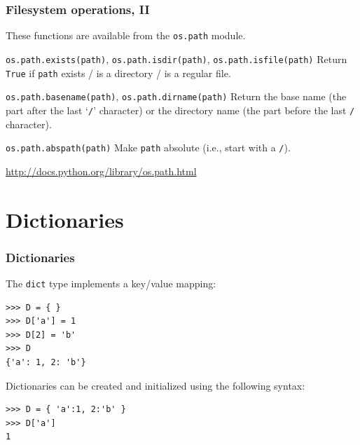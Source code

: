 \documentclass[english,serif,mathserif,xcolor=pdftex,dvipsnames,table]{beamer}
\begin{document}
\begin{frame}[fragile]
  \frametitle{Filesystem operations, II}
  These functions are available from the \texttt{os.path} module.

  \begin{describe}{\lstinline|os.path.exists(path)|, \lstinline|os.path.isdir(path)|, \lstinline|os.path.isfile(path)|}
    Return \texttt{True} if \texttt{path} exists / is a directory / is
    a regular file.
  \end{describe}

  \begin{describe}{\lstinline|os.path.basename(path)|,
      \lstinline|os.path.dirname(path)|}
    Return the base name (the part after the last `\texttt{/}'
    character) or the directory name (the part before the last
    \texttt{/} character).
  \end{describe}

  \begin{describe}{\lstinline|os.path.abspath(path)|}
    Make \texttt{path} absolute (i.e., start with a \texttt{/}).
  \end{describe}

  \begin{references}
    \url{http://docs.python.org/library/os.path.html}
  \end{references}
\end{frame}


\section{Dictionaries}


\begin{frame}[fragile]
  \frametitle{Dictionaries}
  The \texttt{dict} type implements a key/value mapping:
\begin{lstlisting}
>>> D = { }
>>> D['a'] = 1
>>> D[2] = 'b'
>>> D
{'a': 1, 2: 'b'}
\end{lstlisting}

\+
  Dictionaries can be created and initialized using the following syntax:
\begin{lstlisting}
>>> D = { 'a':1, 2:'b' }
>>> D['a']
1
\end{lstlisting}
\end{frame}
\end{document}
